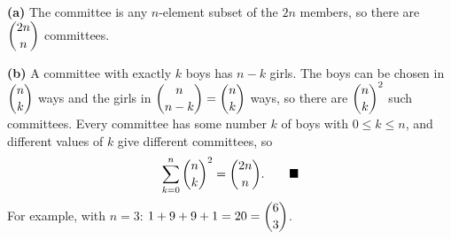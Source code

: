 \textbf{(a)} The committee is any $n$-element subset of the $2n$ members, so there are $\dbinom{2n}{n}$ committees.

\textbf{(b)} A committee with exactly $k$ boys has $n-k$ girls. The boys can be chosen in $\dbinom nk$ ways and the girls in $\dbinom{n}{n-k}=\dbinom nk$ ways, so there are $\dbinom nk^2$ such committees. Every committee has some number $k$ of boys with $0\le k\le n$, and different values of $k$ give different committees, so
\[
\sum_{k=0}^{n}\dbinom nk^2=\dbinom{2n}{n}. \qquad\blacksquare
\]
For example, with $n=3$: $1+9+9+1=20=\dbinom63$.
